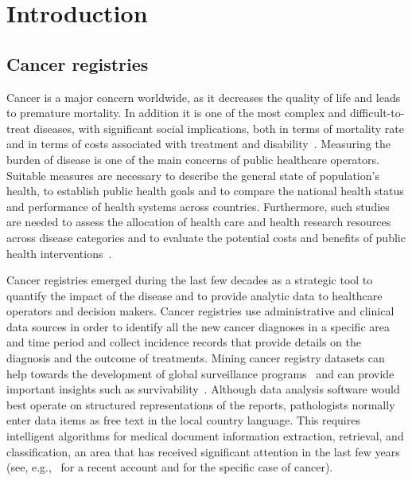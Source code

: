 \chapter{Introduction}
\label{ch:introduction}

\section{Cancer registries}
Cancer is a major concern worldwide, as it decreases the quality of
life and leads to premature mortality. In addition it is one of the
most complex and difficult-to-treat
diseases, with significant social implications, both in terms of
mortality rate and in terms of costs associated with treatment and
disability~\cite{sullivan_delivering_2011,b._stewart_world_2014,desantis_cancer_2014,siegel_cancer_2016}.
Measuring the burden of disease is one of the main concerns of public
healthcare operators. Suitable measures are necessary to describe the general state
of population’s health, to establish public health goals and to
compare the national health status and performance of health systems
across countries. Furthermore, such studies are needed to assess the
allocation of health care and health research resources across disease
categories and to evaluate the potential costs and benefits of public
health interventions~\cite{brown_burden_2001}.

Cancer registries emerged during the last few decades as a strategic
tool to quantify the impact of the disease and to provide analytic
data to healthcare operators and decision makers.  Cancer registries
use administrative and clinical data sources in order to identify all
the new cancer diagnoses in a specific area and time period and
collect incidence records that provide details on the diagnosis and
the outcome of treatments.  Mining cancer registry datasets can help
towards the development of global surveillance
programs~\cite{tourassi_deep_2017} and can provide important insights
such as survivability~\cite{delen_predicting_2005}.  Although data
analysis software would best operate on structured representations of
the reports, pathologists normally enter data items as free text in
the local country language. This requires intelligent algorithms for
medical document information extraction, retrieval, and
classification, an area that has received significant attention in the
last few years (see, e.g.,~\cite{mujtaba_clinical_2019} for a recent
account and \cite{yim_natural_2016} for the specific case of cancer).

